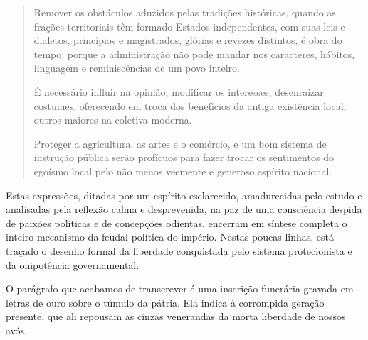 \begin{quote}
Remover os obstáculos aduzidos pelas tradições históricas, quando as
frações territoriais têm formado Estados independentes, com suas leis e
dialetos, princípios e magistrados, glórias e revezes distintos, é obra
do tempo; porque a administração não pode mandar nos caracteres,
hábitos, linguagem e reminiscências de um povo inteiro.

É necessário influir na opinião, modificar os interesses, desenraizar
costumes, oferecendo em troca dos benefícios da antiga existência local,
outros maiores na coletiva moderna.

Proteger a agricultura, as artes e o comércio, e um bom sistema de
instrução pública serão profícuos para fazer trocar os sentimentos do
egoísmo local pelo não menos veemente e generoso espírito nacional.
\end{quote}

Estas expressões, ditadas por um espírito esclarecido, amadurecidas pelo
estudo e analisadas pela reflexão calma e desprevenida, na paz de uma
consciência despida de paixões políticas e de concepções odientas,
encerram em síntese completa o inteiro mecanismo da feudal política do
império. Nestas poucas linhas, está traçado o desenho formal da
liberdade conquistada pelo sistema protecionista e da onipotência
governamental.

O parágrafo que acabamos de transcrever é uma inscrição funerária
gravada em letras de ouro sobre o túmulo da pátria. Ela indica à
corrompida geração presente, que ali repousam as cinzas venerandas da
morta liberdade de nossos avós.


